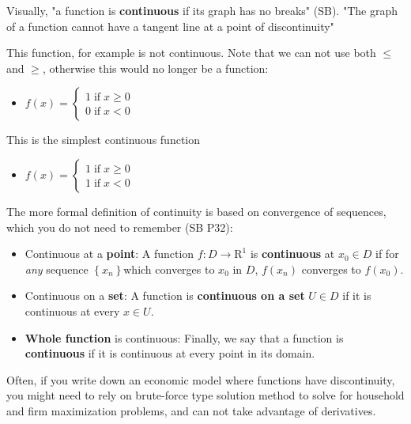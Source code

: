 \documentclass[
]{book}
\providecommand{\tightlist}{%
  \setlength{\itemsep}{0pt}\setlength{\parskip}{0pt}}
\begin{document}
Visually, "a function is \textbf{continuous} if its graph has no breaks"
(SB). "The graph of a function cannot have a tangent line at a point of
discontinuity"

This function, for example is not continuous. Note that we can not use
both \(\le\) and \(\ge\), otherwise this would no longer be a function:

\begin{itemize}
\tightlist
\item
  \(\displaystyle f(x)=\left\lbrace \begin{array}{c} 1\;\textrm{if}\;x\ge 0\\ 0\;\textrm{if}\;x<0 \end{array}\right.\)
\end{itemize}

This is the simplest continuous function

\begin{itemize}
\tightlist
\item
  \(\displaystyle f(x)=\left\lbrace \begin{array}{c} 1\;\textrm{if}\;x\ge 0\\ 1\;\textrm{if}\;x<0 \end{array}\right.\)
\end{itemize}

The more formal definition of continuity is based on convergence of
sequences, which you do not need to remember (SB P32):

\begin{itemize}
\item
  Continuous at a \textbf{point}: A function \(f:D\to {{\textrm{R}}}^1\) is
  \textbf{continuous} at \(x_0 \in D\) if for \emph{any} sequence
  \(\left\lbrace x_n \right\rbrace\)which converges to \(x_0\) in \(D\),
  \(f(x_n )\) converges to \(f(x_0 )\).
\item
  Continuous on a \textbf{set}: A function is \textbf{continuous on a set}
  \(U\in D\) if it is continuous at every \(x\in U\).
\item
  \textbf{Whole function} is continuous: Finally, we say that a function is
  \textbf{continuous} if it is continuous at every point in its domain.
\end{itemize}

Often, if you write down an economic model where functions have
discontinuity, you might need to rely on brute-force type solution
method to solve for household and firm maximization problems, and can
not take advantage of derivatives.
\end{document}

